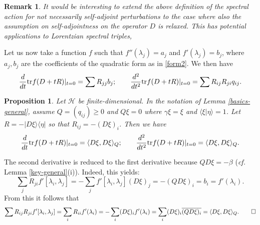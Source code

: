 \documentclass{amsart}
\newtheorem{prop}[thm]{Proposition}
\newtheorem{rem}[thm]{Remark}
\def\tr{{\rm Tr}}
\def\tr{{\rm tr}}
\def\cH{{\mathcal H}}
\def\tr{{\rm tr}}
\def\tr{{\rm tr}}
\def\cH{{\mathcal H}}
\begin{document}
\begin{rem}
  It would be interesting to extend the above definition of the spectral action for not necessarily self-adjoint perturbations to the case where also the assumption on self-adjointness on the operator $D$ is relaxed. This has potential applications to Lorentzian spectral triples, 
  \end{rem}



 
 Let us now take a function $f$ such that $f''(\lambda_j) = a_j$ and $f' (\lambda_j) = b_j$, where $a_j,b_j$ are the coefficients of the quadratic form as in \ref{form2}. We then have 
$$
 \frac{d}{dt} \tr f(D+tR) |_{t=0} = \sum R_{jj} b_{j}; \qquad 
 \frac{d^2}{dt^2} \tr f(D+tR) |_{t=0} = \sum R_{ij} R_{ji} q_{ij}. %
$$

 \begin{prop}
   \label{prop:der-sa}
   Let $\cH$ be finite-dimensional. In the notation of Lemma \ref{basics-general}, assume $Q= (q_{ij}) \geq 0$ and $Q \xi =0$ where $\gamma \xi =\xi$ and $\langle \xi | \eta \rangle = 1$. 
   Let $R = - | D \xi \rangle \langle \eta |$ so that $R_{ij} = - (D\xi)_i$. Then we have 
   $$
 \frac{d}{dt} \tr f(D+tR) |_{t=0} = \langle D \xi, D \xi \rangle_Q; \qquad 
 \frac{d^2}{dt^2} \tr f(D+tR) |_{t=0} =  \langle D \xi, D \xi \rangle_Q.
$$
 \end{prop}
 \proof
 The second derivative is reduced to the first derivative because  $QD \xi = -\beta$ ({\em cf.} Lemma \ref{key-general}(i)). Indeed, this yields:
 $$
\sum_j R_{ji} f' [\lambda_{i},\lambda_{j}] = - \sum_j f' [\lambda_{i},\lambda_{j}] (D \xi)_j = - (Q D \xi)_i  = b_i = f'(\lambda_i). 
$$
From this it follows that
\[
\sum R_{ij} R_{ji} f' [\lambda_{i},\lambda_{j}] = \sum_i  R_{ii} f'(\lambda_i) =-  \sum_i  (D \xi)_i f'(\lambda_i) =  \sum_i  (D \xi)_i \overline{ (Q D \xi)_i} = \langle D \xi , D \xi \rangle_Q.
\qedhere
\]
\endproof


\end{document}
